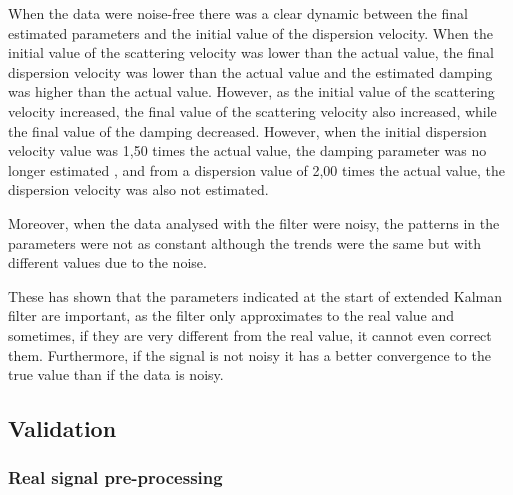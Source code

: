 \documentclass[12pt, a4paper]{article} %
\begin{document}
	When the data were noise-free there was a clear dynamic between the final estimated parameters and the initial value of the dispersion velocity. When the initial value of the scattering velocity was lower than the actual value, the final dispersion velocity was lower than the actual value and the estimated damping was higher than the actual value. However, as the initial value of the scattering velocity increased, the final value of the scattering velocity also increased, while the final value of the damping decreased. However, when the initial dispersion velocity value was 1,50 times the actual value, the damping parameter was no longer estimated , and from a dispersion value of 2,00 times the actual value, the dispersion velocity was also not estimated.
	
	Moreover, when the data analysed with the filter were noisy, the patterns in the parameters were not as constant although the trends were the same but with different values due to the noise.
	
	These has shown that the parameters indicated at the start of extended Kalman filter are important, as the filter only approximates to the real value and sometimes, if they are very different from the real value, it cannot even correct them. Furthermore, if the signal is not noisy it has a better convergence to the true value than if the data is noisy.
	
	\setlength{\parskip}{0mm}
	
	\subsection{Validation}
	
	\subsubsection{Real signal pre-processing}
	
\end{document}
